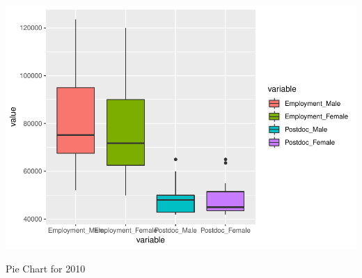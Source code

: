 \documentclass[]{article}
\begin{document}
\includegraphics{Assignment_5_Markdown_files/figure-latex/unnamed-chunk-8-1.pdf}

Pie Chart for 2010
\end{document}
